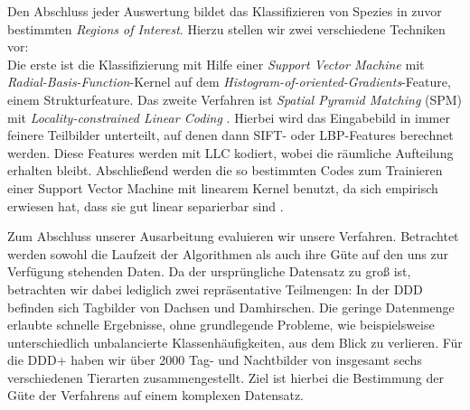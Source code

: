 Den Abschluss jeder Auswertung bildet das Klassifizieren von Spezies in zuvor bestimmten \emph{Regions of Interest}. Hierzu stellen wir zwei verschiedene Techniken vor: \\
Die erste ist die Klassifizierung mit Hilfe einer \emph{Support Vector Machine} mit \emph{Radial-Basis-Function}-Kernel auf dem \emph{Histogram-of-oriented-Gradients}-Feature, einem Strukturfeature. 
Das zweite Verfahren ist \emph{Spatial Pyramid Matching} (SPM) mit \emph{Locality-constrained Linear Coding} \cite{lsp06}. Hierbei wird das Eingabebild in immer feinere Teilbilder unterteilt, auf denen dann SIFT- oder LBP-Features berechnet werden. Diese Features werden mit LLC kodiert, wobei die räumliche Aufteilung erhalten bleibt. Abschließend werden die so bestimmten Codes zum Trainieren einer Support Vector Machine mit linearem Kernel benutzt, da sich empirisch erwiesen hat, dass sie gut linear separierbar sind \cite{yygh09}. 

Zum Abschluss unserer Ausarbeitung evaluieren wir unsere Verfahren. Betrachtet werden sowohl die Laufzeit der Algorithmen als auch ihre Güte auf den uns zur Verfügung stehenden Daten. Da der ursprüngliche Datensatz zu groß ist, betrachten wir dabei lediglich zwei repräsentative Teilmengen:
In der DDD befinden sich Tagbilder von Dachsen und Damhirschen. Die geringe Datenmenge erlaubte schnelle Ergebnisse, ohne grundlegende Probleme, wie beispielsweise unterschiedlich unbalancierte Klassenhäufigkeiten, aus dem Blick zu verlieren.
Für die DDD+ haben wir über 2000 Tag- und Nachtbilder von insgesamt sechs verschiedenen Tierarten zusammengestellt. Ziel ist hierbei die Bestimmung der Güte der Verfahrens auf einem komplexen Datensatz.
